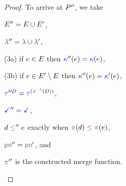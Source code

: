 \begin{lemma}
\begin{proof}
    To arrive at $P''$, we take
    \begin{enumerate*}
    \item
      $E''=E\cup E'$,
    \item
      $\labeling''=\labeling\cup\labeling'$,
    \item[(3a)]
      if $e\in E$ then ${\color{blue}\kappa}''(e)={\color{blue}\kappa}(e)$,
    \item[(3b)]
      if $e\in E'\setminus E$ then ${\color{blue}\kappa}''(e)={\color{blue}\kappa}'(e)$,
    \item
      $\aTr{\prime\prime\bEvs}{}=\aTr{(\fmrginv{\bEvs})}{}$,
    \item
      $\aTerm''=\aTerm$,
    \item \label{le-item}
      ${\bEv}\le'' {\aEv}$ exactly when $\fmrg{\bEv}\le\fmrg{\aEv}$,
    \item \label{pox-item}
      ${\rpox''}={\rpox'}$, and
    \item 
      $\fmrg{}''$ is the constructed merge function. %
    \end{enumerate*}
  \end{proof}
\end{lemma}
